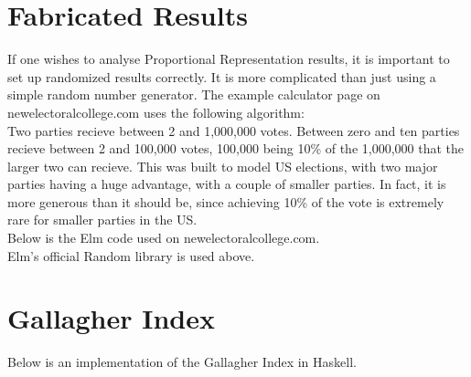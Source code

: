 \documentclass{article}
\begin{document}
    

    \section{Fabricated Results}

    If one wishes to analyse Proportional Representation results, it is important to set up randomized results correctly. It is more complicated than just using a simple random number generator. The example calculator page on newelectoralcollege.com uses the following algorithm: \\

    Two parties recieve between 2 and 1,000,000 votes. Between zero and ten parties recieve between 2 and 100,000 votes, 100,000 being 10\% of the 1,000,000 that the larger two can recieve. This was built to model US elections, with two major parties having a huge advantage, with a couple of smaller parties. In fact, it is more generous than it should be, since achieving 10\% of the vote is extremely rare for smaller parties in the US. \\

    Below is the Elm code used on newelectoralcollege.com. \\

    

    Elm's official Random library is used above.

    \section{Gallagher Index}

    Below is an implementation of the Gallagher Index in Haskell.

    
\end{document}
